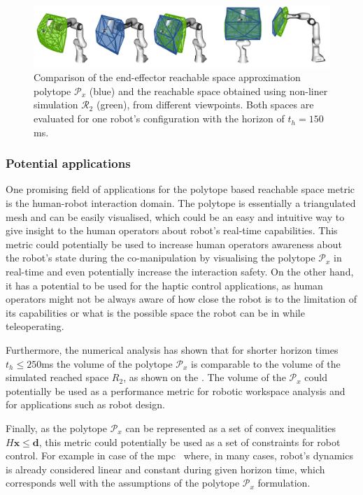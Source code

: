 \begin{figure}[!t]
    \centering
    \includegraphics[width=\textwidth]{Papers/images/c3.png}
    \caption{Comparison of the end-effector reachable space approximation polytope $\mathcal{P}_x$ (blue) and the reachable space obtained using non-liner simulation $\mathcal{R}_2$ (green), from different viewpoints. Both spaces are evaluated for one robot's configuration with the horizon of $t_h=150$ms. }
    \label{fig:comparisson_simu_convex}
\end{figure}

\subsubsection{Potential applications}

One promising field of applications for the polytope based reachable space metric is the human-robot interaction domain. The polytope is essentially a triangulated mesh and can be easily visualised, which could be an easy and intuitive way to give insight to the human operators about robot's real-time capabilities. This metric could potentially be used to increase human operators awareness about the robot's state during the co-manipulation by visualising the polytope $\mathcal{P}_x$ in real-time and even potentially increase the interaction safety. On the other hand, it has a potential to be used for the haptic control applications, as human operators might not be always aware of how close the robot is to the limitation of its capabilities or what is the possible space the robot can be in while teleoperating. 

Furthermore, the numerical analysis has shown that for shorter horizon times $t_h\leq250$ms the volume of the polytope $\mathcal{P}_x$ is comparable to the volume of the simulated reached space $R_2$, as shown on the . The volume of the $\mathcal{P}_x$ could potentially be used as a performance metric for robotic workspace analysis and for applications such as robot design.

Finally, as the polytope $\mathcal{P}_x$ can be represented as a set of convex inequalities $H\bm{x}\leq\bm{d}$, this metric could potentially be used as a set of constraints for robot control. For example in case of the \gls{mpc}~\cite{Kouvaritakis2016} where, in many cases, robot's dynamics is already considered linear and constant during given horizon time, which corresponds well with the assumptions of the polytope $\mathcal{P}_x$ formulation. 

